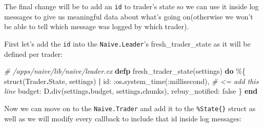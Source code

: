 \documentclass[
]{book}
\newenvironment{Shaded}{\begin{snugshade}}{\end{snugshade}}
\newcommand{\CommentTok}[1]{\textcolor[rgb]{0.56,0.35,0.01}{\textit{#1}}}
\newcommand{\ConstantTok}[1]{\textcolor[rgb]{0.00,0.00,0.00}{#1}}
\newcommand{\KeywordTok}[1]{\textcolor[rgb]{0.13,0.29,0.53}{\textbf{#1}}}
\newcommand{\NormalTok}[1]{#1}
\newcommand{\OperatorTok}[1]{\textcolor[rgb]{0.81,0.36,0.00}{\textbf{#1}}}
\newcommand{\VariableTok}[1]{\textcolor[rgb]{0.00,0.00,0.00}{#1}}
\begin{document}
The final change will be to add an \texttt{id} to trader's state so we can use it inside log messages to give us meaningful data about what's going on(otherwise we won't be able to tell which message was logged by which trader).

First let's add the \texttt{id} into the \texttt{Naive.Leader}'s fresh\_trader\_state as it will be defined per trader:

\begin{Shaded}
\begin{Highlighting}[]
  \CommentTok{\# /apps/naive/lib/naive/leader.ex}
  \KeywordTok{defp}\NormalTok{ fresh\_trader\_state(settings) }\KeywordTok{do}
\NormalTok{    \%\{}
\NormalTok{      struct(}\ConstantTok{Trader}\OperatorTok{.}\ConstantTok{State}\NormalTok{, settings)}
      \OperatorTok{|} \VariableTok{id:} \VariableTok{:os}\OperatorTok{.}\NormalTok{system\_time(}\VariableTok{:millisecond}\NormalTok{), }\CommentTok{\# \textless{}= add this line}
        \VariableTok{budget:}\NormalTok{ D}\OperatorTok{.}\NormalTok{div(settings}\OperatorTok{.}\NormalTok{budget, settings}\OperatorTok{.}\NormalTok{chunks),}
        \VariableTok{rebuy\_notified:} \ConstantTok{false}
\NormalTok{    \}}
  \KeywordTok{end}
\end{Highlighting}
\end{Shaded}

Now we can move on to the \texttt{Naive.Trader} and add it to the \texttt{\%State\{\}} struct as well as we will modify every callback to include that id inside log messages:
\end{document}
